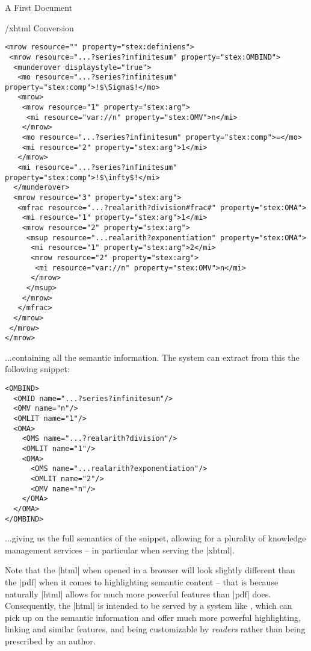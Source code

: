 \begin{sfragment}{A First \sTeX Document}
\begin{sfragment}{\omdoc/xhtml Conversion}
\begin{lstlisting}[escapechar=!,
morekeywords={property,resource,stex:comp,stex:arg,stex:OMA,stex:OMV}]
<mrow resource="" property="stex:definiens">
 <mrow resource="...?series?infinitesum" property="stex:OMBIND">
  <munderover displaystyle="true">
   <mo resource="...?series?infinitesum" property="stex:comp">!$\Sigma$!</mo>
   <mrow>
    <mrow resource="1" property="stex:arg">
     <mi resource="var://n" property="stex:OMV">n</mi>
    </mrow>
    <mo resource="...?series?infinitesum" property="stex:comp">=</mo>
    <mi resource="2" property="stex:arg">1</mi>
   </mrow>
   <mi resource="...?series?infinitesum" property="stex:comp">!$\infty$!</mi>
  </munderover>
  <mrow resource="3" property="stex:arg">
   <mfrac resource="...?realarith?division#frac#" property="stex:OMA">
    <mi resource="1" property="stex:arg">1</mi>
    <mrow resource="2" property="stex:arg">
     <msup resource="...realarith?exponentiation" property="stex:OMA">
      <mi resource="1" property="stex:arg">2</mi>
      <mrow resource="2" property="stex:arg">
       <mi resource="var://n" property="stex:OMV">n</mi>
      </mrow>
     </msup>
    </mrow>
   </mfrac>
  </mrow>
 </mrow>
</mrow>
      \end{lstlisting}
      ...containing all the semantic information. The \mmt system
      can extract from this the following \openmath snippet:

      \begin{lstlisting}[escapechar=!]
<OMBIND>
  <OMID name="...?series?infinitesum"/>
  <OMV name="n"/>
  <OMLIT name="1"/>
  <OMA>
    <OMS name="...?realarith?division"/>
    <OMLIT name="1"/>
    <OMA>
      <OMS name="...realarith?exponentiation"/>
      <OMLIT name="2"/>
      <OMV name="n"/>
    </OMA>
  </OMA>
</OMBIND>
      \end{lstlisting}
      ...giving us the full semantics of the snippet, allowing for
      a plurality of knowledge management services -- in particular
      when serving the |xhtml|.

      \begin{remark}
          Note that the |html| when opened in a browser will
          look slightly different than the |pdf| when it comes
          to highlighting semantic content -- that is because
          naturally |html| allows for much more powerful
          features than |pdf| does. Consequently, the |html|
          is intended to be served by a system like \mmt,
          which can pick up on the semantic information and
          offer much more powerful highlighting, linking
          and similar features, and being customizable by
          \emph{readers} rather than being prescribed by an author.


\end{remark}
\end{sfragment}
\end{sfragment}

